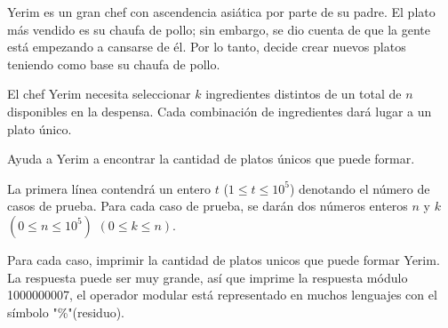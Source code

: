 
Yerim es un gran chef con ascendencia asiática por parte de su padre. El plato más vendido es su chaufa de pollo; sin embargo, se dio cuenta de que la gente está empezando a cansarse de él. Por lo tanto, decide crear nuevos platos teniendo como base su chaufa de pollo.

El chef Yerim necesita seleccionar $k$ ingredientes distintos de un total de $n$ disponibles en la despensa. Cada combinación de ingredientes dará lugar a un plato único.

Ayuda a Yerim a encontrar la cantidad de platos únicos que puede formar.




La primera línea contendrá un entero $t$ ($1\leq t \leq 10^5$) denotando el número de casos de prueba. Para cada caso de prueba, se darán dos números enteros $n$ y $k$ $(0 \leq n \leq10^5)$ $(0 \leq k \leq n)$.

\outputText

Para cada caso, imprimir la cantidad de platos unicos que puede formar Yerim.\\
La respuesta puede ser muy grande, así que imprime la respuesta módulo 1000000007, el operador modular está representado en muchos lenguajes con el símbolo "\%"(residuo).

\exampleCases

\begin{example}
\end{example}


